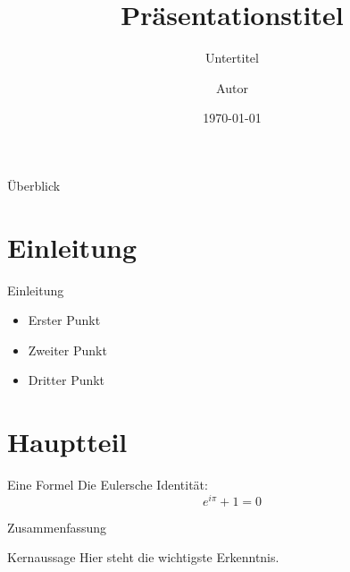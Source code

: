 \documentclass{beamer}
\title{Präsentationstitel}
\subtitle{Untertitel}
\author{Autor}
\institute{Institution}
\date{\today}
\begin{document}
\begin{frame}
    \titlepage
\end{frame}

\begin{frame}{Überblick}
    \tableofcontents
\end{frame}

\section{Einleitung}

\begin{frame}{Einleitung}
    \begin{itemize}
        \item Erster Punkt
        \item Zweiter Punkt
        \item Dritter Punkt
    \end{itemize}
\end{frame}

\section{Hauptteil}

\begin{frame}{Eine Formel}
    Die Eulersche Identität:
    \[
        e^{i\pi} + 1 = 0
    \]
\end{frame}

\begin{frame}{Zusammenfassung}
    \begin{block}{Kernaussage}
        Hier steht die wichtigste Erkenntnis.
    \end{block}
\end{frame}
\end{document}
